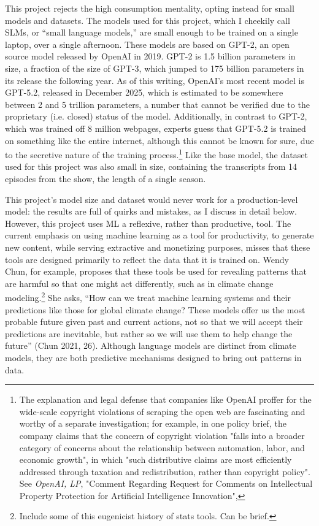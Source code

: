 \documentclass[11pt]{article}
\begin{document}
This project rejects the high consumption mentality, opting instead
for small models and datasets. The models used for this project, which
I cheekily call SLMs, or “small language models,” are small enough to
be trained on a single laptop, over a single afternoon. These models
are based on GPT-2, an open source model released by OpenAI in 2019.
GPT-2 is 1.5 billion parameters in size, a fraction of the size of
GPT-3, which jumped to 175 billion parameters in its release the
following year. As of this writing, OpenAI’s most recent model is
GPT-5.2, released in December 2025, which is estimated to be somewhere
between 2 and 5 trillion parameters, a number that cannot be verified
due to the proprietary (i.e. closed) status of the model.
Additionally, in contrast to GPT-2, which was trained off 8 million
webpages, experts guess that GPT-5.2 is trained on something like the
entire internet, although this cannot be known for sure, due to the
secretive nature of the training process.\footnote{The explanation and legal defense that companies like OpenAI
proffer for the wide-scale copyright violations of scraping the
open web are fascinating and worthy of a separate
investigation; for example, in one policy brief, the company
claims that the concern of copyright violation "falls into a
broader category of concerns about the relationship between
automation, labor, and economic growth", in which "such
distributive claims are most efficiently addressed through
taxation and redistribution, rather than copyright policy". See
\emph{OpenAI, LP}, "Comment Regarding Request for Comments on
Intellectual Property Protection for Artificial Intelligence
Innovation",} Like the base model,
the dataset used for this project was also small in size, containing
the transcripts from 14 episodes from the show, the length of a single
season.

This project’s model size and dataset would never work for a
production-level model: the results are full of quirks and mistakes,
as I discuss in detail below. However, this project uses ML a
reflexive, rather than productive, tool. The current emphasis on using
machine learning as a tool for productivity, to generate new content,
while serving extractive and monetizing purposes, misses that these
tools are designed primarily to reflect the data that it is trained
on. Wendy Chun, for example, proposes that these tools be used for
revealing patterns that are harmful so that one might act differently,
such as in climate change modeling.\footnote{Include some of this eugenicist history of stats tools. Can be
brief.} She asks, “How can we treat
machine learning systems and their predictions like those for global
climate change? These models offer us the most probable future given
past and current actions, not so that we will accept their predictions
are inevitable, but rather so we will use them to help change the
future” (Chun 2021, 26). Although language models are distinct from
climate models, they are both predictive mechanisms designed to bring
out patterns in data.
\end{document}

